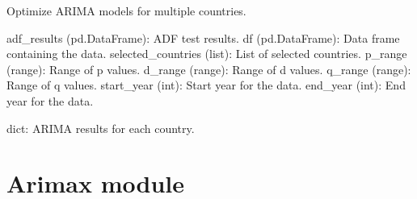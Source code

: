 \documentclass[letterpaper,10pt,english]{sphinxmanual}
\begin{document}

\begin{fulllineitems}
\label{\detokenize{Arima:Arima.optimize_arima_models}}
\pysigstartsignatures
{}
\pysigstopsignatures
\sphinxAtStartPar
Optimize ARIMA models for multiple countries.
\begin{description}
\sphinxAtStartPar
adf\_results (pd.DataFrame): ADF test results.
df (pd.DataFrame): Data frame containing the data.
selected\_countries (list): List of selected countries.
p\_range (range): Range of p values.
d\_range (range): Range of d values.
q\_range (range): Range of q values.
start\_year (int): Start year for the data.
end\_year (int): End year for the data.

\sphinxAtStartPar
dict: ARIMA results for each country.

\end{description}

\end{fulllineitems}


\sphinxstepscope


\section{Arimax module}
\label{\detokenize{Arimax:module-Arimax}}\label{\detokenize{Arimax:arimax-module}}\label{\detokenize{Arimax::doc}}
\end{document}
